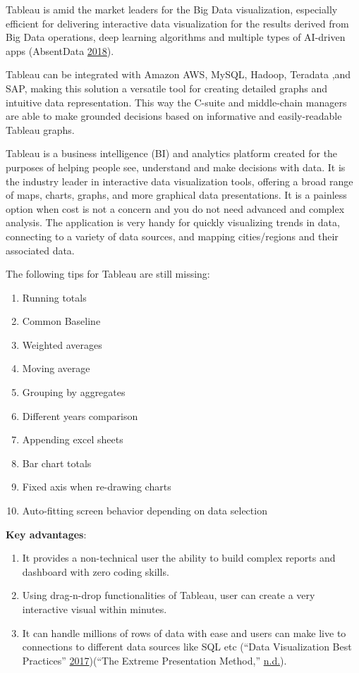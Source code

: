 \documentclass[]{book}
\providecommand{\tightlist}{%
  \setlength{\itemsep}{0pt}\setlength{\parskip}{0pt}}
\begin{document}
Tableau is amid the market leaders for the Big Data visualization, especially efficient for delivering interactive data visualization for the results derived from Big Data operations, deep learning algorithms and multiple types of AI-driven apps (AbsentData \protect\hyperlink{ref-tableau_interactive_viz}{2018}).

Tableau can be integrated with Amazon AWS, MySQL, Hadoop, Teradata ,and SAP, making this solution a versatile tool for creating detailed graphs and intuitive data representation. This way the C-suite and middle-chain managers are able to make grounded decisions based on informative and easily-readable Tableau graphs.

Tableau is a business intelligence (BI) and analytics platform created for the purposes of helping people see, understand and make decisions with data. It is the industry leader in interactive data visualization tools, offering a broad range of maps, charts, graphs, and more graphical data presentations. It is a painless option when cost is not a concern and you do not need advanced and complex analysis. The application is very handy for quickly visualizing trends in data, connecting to a variety of data sources, and mapping cities/regions and their associated data.

The following tips for Tableau are still missing:

\begin{enumerate}
\def\labelenumi{\arabic{enumi}.}
\tightlist
\item
  Running totals
\item
  Common Baseline
\item
  Weighted averages
\item
  Moving average
\item
  Grouping by aggregates
\item
  Different years comparison
\item
  Appending excel sheets
\item
  Bar chart totals
\item
  Fixed axis when re-drawing charts
\item
  Auto-fitting screen behavior depending on data selection
\end{enumerate}

\textbf{Key advantages}:

\begin{enumerate}
\def\labelenumi{\arabic{enumi}.}
\tightlist
\item
  It provides a non-technical user the ability to build complex reports and dashboard with zero coding skills.
\item
  Using drag-n-drop functionalities of Tableau, user can create a very interactive visual within minutes.
\item
  It can handle millions of rows of data with ease and users can make live to connections to different data sources like SQL etc (``Data Visualization Best Practices'' \protect\hyperlink{ref-VizBP}{2017})(``The Extreme Presentation Method,'' \protect\hyperlink{ref-extremepre}{n.d.}).
\end{enumerate}
\end{document}
